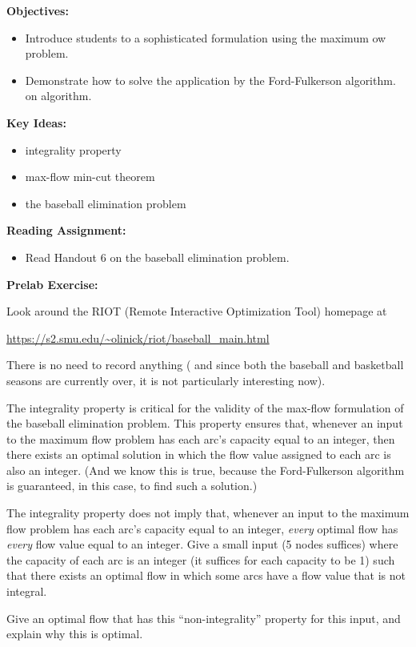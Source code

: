 \documentclass[twoside]{article}%
\begin{document}

\noindent
\textbf{Objectives:}

\begin{itemize}

\item Introduce students to a sophisticated formulation using the maximum 
ow problem.
\item Demonstrate how to solve the application by the Ford-Fulkerson algorithm.
on algorithm.
\end{itemize}

\noindent
\textbf{Key Ideas:}

\begin{minipage}[t]{.45\linewidth}
  \begin{itemize}
   \item integrality property
   \item max-flow min-cut theorem
   \item the baseball elimination problem
  \end{itemize}  
\end{minipage}
\hfill

\vspace{1em}

\noindent
\textbf{Reading Assignment:}
\begin{itemize}
\item
Read Handout 6 on the baseball elimination problem.
\end{itemize}

\noindent
\textbf{Prelab Exercise:}


\noindent
Look around the RIOT (Remote Interactive Optimization Tool) homepage at
\begin{center}
\url{https://s2.smu.edu/~olinick/riot/baseball_main.html}   
\end{center}

\noindent 
There is no need to record anything ( and since both the baseball and basketball seasons are currently over, it is not particularly interesting now).

\smallskip  
\noindent
The integrality property is critical for the validity of the max-flow formulation of the baseball elimination problem. This property ensures that, whenever an input to the maximum flow problem has each arc's capacity equal to an integer, then there exists an optimal solution in which the flow value assigned to each arc is also an integer. (And we know this is true, because the Ford-Fulkerson algorithm is guaranteed, in this case, to find such a solution.)

\smallskip
\noindent
The integrality property does not imply that, whenever an input to the maximum flow problem has each arc's capacity equal to an integer, {\it every} optimal flow has {\it every} flow value equal to an integer. Give a small input (5 nodes suffices) where the capacity of each arc is an integer (it suffices for each capacity to be 1) such that there exists an optimal flow in which some arcs have a flow value that is not integral.

\smallskip
\noindent
Give an optimal flow that has this ``non-integrality'' property for this input, and explain why this is optimal. 
\end{document}
